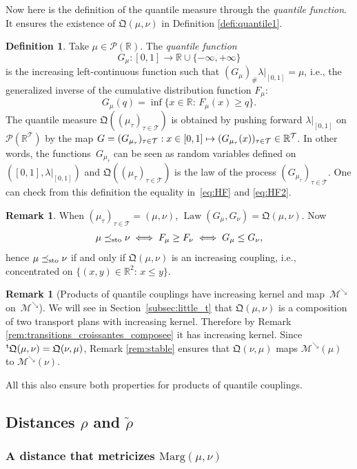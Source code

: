 \documentclass[11pt]{article}
\newcommand{\ie}{i.e.,\xspace}
\newcommand{\Subsection}{\subsection}
\newcommand{\Subsubsection}{\subsubsection}
\newcommand\mto{\mathchoice{\longmapsto}{\mapsto}{\mapsto}{\mapsto}}
\theoremstyle{plain}
\theoremstyle{definition}
\newtheorem{defi}[them]{Definition}
\newtheorem{rem}[them]{Remark}
\newcommand{\como}{\mathfrak{Q}}
\newcommand{\Tt}{{\mathcal T}}
\newcommand{\trans}{{}^{\mathrm{t}}\mkern-1mu}
\newcommand{\Lg}{\lambda|_{[0,1]}}
\newcommand{\p}{\mathcal{P}}
\newcommand{\ma}{\mathrm{Marg}}
\newcommand{\R}{\mathbb{R}}
\newcommand{\law}{\operatorname{Law}}
\newcommand{\leqs}{\preceq_{\text{\rm sto}}}
\newcommand{\mdec}{\mathcal{M}^{\scriptscriptstyle\searrow}}
\begin{document}
Now here is the definition of the quantile measure through the \emph{quantile function}. It ensures the existence of $\como(\mu,\nu)$ in Definition \ref{defi:quantile1}.

\begin{defi}\label{defi:quantile2} Take $\mu\in \p(\R)$. The \emph{quantile function}
\[
G_\mu:[0,1]\to \R\cup\{-\infty,+\infty\}
\]
is the increasing left-continuous function such that $(G_\mu)_\#\Lg=\mu$, \ie the generalized inverse of the cumulative distribution function $F_\mu$:
\[G_\mu(q)=\inf\{x\in\R:\,F_\mu (x)\geq q\}.\]
The quantile measure $\como((\mu_\tau)_{\tau\in\Tt})$ is obtained by pushing forward $\Lg$ on $\p(\R^{\Tt})$ by the map $G=(G_{\mu_\tau})_{\tau\in \Tt}:x\in [0,1]\mto (G_{\mu_{\tau}}(x))_{\tau\in\Tt}\in \R^{\Tt}$.
In other words, the functions~$G_{\mu_{\tau}}$ can be seen as random variables defined on $([0,1],\Lg)$ and $\como((\mu_\tau)_{\tau\in\Tt})$ is the law of the process $(G_{\mu_{\tau}})_{\tau\in\Tt}$. One can check from this definition the equality in~\eqref{eq:HF} and \eqref{eq:HF2}.
\end{defi}

\begin{rem}\label{rem:quantile_up}
When $(\mu_{\tau})_{\tau\in \Tt}=(\mu,\nu)$, $\law (G_\mu,G_\nu)=\como(\mu,\nu)$. Now
\[
\mu\leqs \nu\iff F_\mu\geq F_\nu \iff G_\mu\leq G_\nu,
\]
hence $\mu\leqs \nu$ if and only if $\como(\mu,\nu)$ is an increasing coupling, \ie concentrated on $\{(x,y)\in \R^2:\,x\leq y\}$.
\end{rem}

\begin{rem}[Products of quantile couplings have increasing kernel and map~$\mdec$ on~$\mdec$]\label{rem:quantile_transitions_croissantes}
We will see in Section~\ref{subsec:little_t} that $\como(\mu,\nu)$ is a composition of two transport plans with increasing kernel. Therefore by Remark \ref{rem:transitions_croissantes_composee} it has increasing kernel. Since $\trans \como(\mu,\nu)=\como(\nu,\mu)$, Remark \ref{rem:stable} ensures that $\como(\nu,\mu)$ maps $\mdec(\mu)$ to $\mdec(\nu)$.

All this also ensure both properties for products of quantile couplings.
\end{rem}

\Subsection{Distances $\rho$ and $\tilde \rho$}\label{subsec:rho}

\Subsubsection{A distance that metricizes $\ma(\mu,\nu)$}
\end{document}
